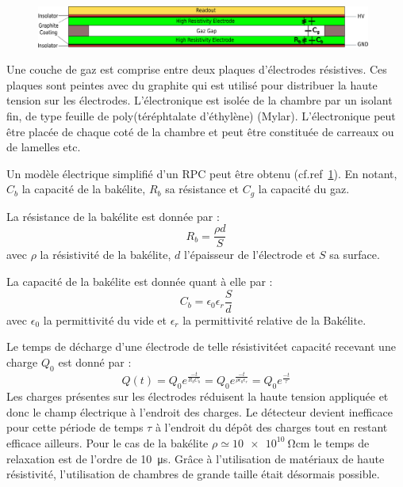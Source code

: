 \begin{figure}[th!]
	\centering
	\includegraphics[width=0.98\textwidth]{RPC/scheme_first.png}
	\label{RPCscheme}
\end{figure}
\vspace{-0.1cm}
Une couche de gaz est comprise entre deux plaques d'électrodes résistives. Ces plaques sont peintes avec du graphite qui est utilisé pour distribuer la haute tension sur les électrodes. L'électronique est isolée de la chambre par un isolant fin, de type feuille de poly(téréphtalate d'éthylène) (Mylar). L'électronique peut être placée de chaque coté de la chambre et peut être constituée de carreaux ou de lamelles etc.

Un modèle électrique simplifié d'un RPC peut être obtenu (cf.ref~\ref{RPCscheme}). En notant, $C_{b}$ la capacité de la bakélite, $R_{b}$ sa résistance et $C_{g}$ la capacité du gaz.

La résistance de la bakélite est donnée par :
\begin{equation}
R_b=\frac{\rho d}{S}
\end{equation}
avec $\rho$ la résistivité de la bakélite, $d$ l'épaisseur de l'électrode et $S$ sa surface.

La capacité de la bakélite est donnée quant à elle par :
\begin{equation}
C_{b}=\epsilon_0\epsilon_r\frac{S}{d}
\end{equation} 
avec $\epsilon_0$ la permittivité du vide et $\epsilon_r$ la permittivité relative de la Bakélite.

Le temps de décharge d'une électrode de telle résistivitéet capacité recevant une charge $Q_{0}$ est donné par :
\begin{equation}
Q(t)=Q_{0}e^{\frac{-t}{R_bC_b}}=Q_{0}e^{\frac{-t}{\rho\epsilon_{0}\epsilon_{r}}}=Q_{0}e^{\frac{-t}{\tau}}
\end{equation}
Les charges présentes sur les électrodes réduisent la haute tension appliquée et donc le champ électrique à l'endroit des charges. Le détecteur devient inefficace pour cette période de temps $\tau$ à l'endroit du dépôt des charges tout en restant efficace ailleurs. Pour le cas de la bakélite $\rho\simeq\SI{10e10}{\ohm\centi\meter}$ le temps de relaxation est de l'ordre de \SI{10}{\micro\second}. Grâce à l'utilisation de matériaux de haute résistivité, l'utilisation de chambres de grande taille était désormais possible.


